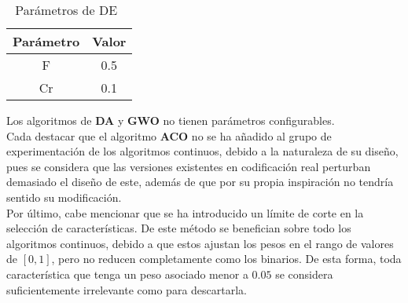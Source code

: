 \begin{table}[htp]
    \centering
    \begin{tabular}{ c c }
        \hline
        \textbf{Parámetro} & \textbf{Valor} \\
        \hline
        F                  & 0.5            \\
        Cr                 & 0.1            \\
        \hline
    \end{tabular}
    \caption{Parámetros de DE~\cite{storn_differential_1997}}
\end{table}

Los algoritmos de \textbf{DA} y \textbf{GWO} no tienen parámetros configurables.\\[6pt]
Cada destacar que el algoritmo \textbf{ACO} no se ha añadido al grupo de experimentación de los algoritmos continuos, debido a la naturaleza de su diseño, pues se considera que las versiones existentes en codificación real perturban demasiado el diseño de este, además de que por su propia inspiración no tendría sentido su modificación.\\[6pt]
Por último, cabe mencionar que se ha introducido un límite de corte en la selección de características. De este método se benefician sobre todo los algoritmos continuos, debido a que estos ajustan los pesos en el rango de valores de $[0,1]$, pero no reducen completamente como los binarios. De esta forma, toda característica que tenga un peso asociado menor a $0.05$ se considera suficientemente irrelevante como para descartarla.